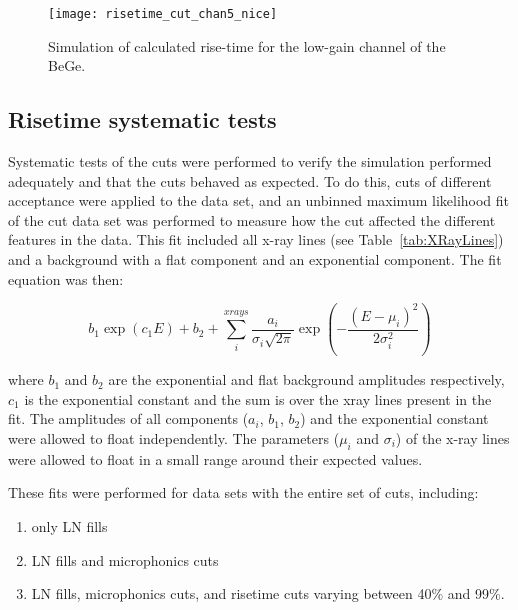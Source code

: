 				\begin{figure}
					\centering
					\texttt{[image: risetime\_cut\_chan5\_nice]}
					\caption[Simulation of calculated rise-time for the low-gain channel of the BeGe]
					{Simulation of calculated rise-time for the low-gain channel of the BeGe.}
					\label{fig:RisetimeSimulation}
				\end{figure}	
	
		\subsection{Risetime systematic tests}
		\label{sec:RisetimeSystematicTests}	
	
	Systematic tests of the cuts were performed to verify the simulation performed adequately and that the cuts behaved as expected.  To do this, cuts of different acceptance were applied to the data set, and an unbinned maximum likelihood fit of the cut data set was performed to measure how the cut affected the different features in the data.  This fit included all x-ray lines (see Table~\ref{tab:XRayLines}) and a background with a flat component and an exponential component.  The fit equation was then:

					\begin{equation}
						b_{1} \exp\left(c_{1} E\right) + b_{2} + \sum^{xrays}_{i} \frac{a_{i}}{\sigma_{i}\sqrt{2 \pi}} 
							\exp\left(-\frac{(E - \mu_{i})^{2}}{2 \sigma_{i}^{2}}\right)
						\label{eqn:InitialFitEqn}
					\end{equation}

where $b_{1}$ and $b_{2}$ are the exponential and flat background amplitudes respectively, $c_{1}$ is the exponential constant and the sum is over the xray lines present in the fit.  The amplitudes of all components ($a_{i}$, $b_{1}$, $b_{2}$) and the exponential constant were allowed to float independently.  The parameters ($\mu_{i}$ and $\sigma_{i}$) of the x-ray lines were allowed to float in a small range around their expected values.  

These fits were performed for data sets with the entire set of cuts, including:

					\begin{enumerate}
						\item only LN fills
						\item LN fills and microphonics cuts
						\item LN fills, microphonics cuts, and risetime cuts varying between 40\% and 99\%.
					\end{enumerate}

